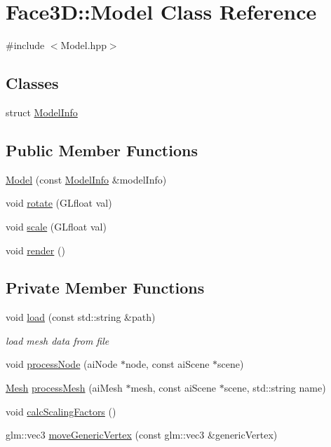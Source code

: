 \hypertarget{class_face3_d_1_1_model}{}\section{Face3D\+:\+:Model Class Reference}
\label{class_face3_d_1_1_model}


{\ttfamily \#include $<$Model.\+hpp$>$}

\subsection*{Classes}
\begin{DoxyCompactItemize}
\item 
struct \hyperlink{struct_face3_d_1_1_model_1_1_model_info}{Model\+Info}
\end{DoxyCompactItemize}
\subsection*{Public Member Functions}
\begin{DoxyCompactItemize}
\item 
\hyperlink{class_face3_d_1_1_model_ae6cd2c6069f0c1f0898ea45356f31250}{Model} (const \hyperlink{struct_face3_d_1_1_model_1_1_model_info}{Model\+Info} \&model\+Info)
\item 
void \hyperlink{class_face3_d_1_1_model_a47fdb34677d2a77da048e614e9100a86}{rotate} (G\+Lfloat val)
\item 
void \hyperlink{class_face3_d_1_1_model_ae4317800ef498c03728e7c82dbe5c3c7}{scale} (G\+Lfloat val)
\item 
void \hyperlink{class_face3_d_1_1_model_a88e8ee28d3babfcb7090f7941663e594}{render} ()
\end{DoxyCompactItemize}
\subsection*{Private Member Functions}
\begin{DoxyCompactItemize}
\item 
void \hyperlink{class_face3_d_1_1_model_a6a5aeb80314d44476b3964c4b977be7d}{load} (const std\+::string \&path)
\begin{DoxyCompactList}\small\item\em load mesh data from file \end{DoxyCompactList}\item 
void \hyperlink{class_face3_d_1_1_model_a483e8a42f180d07ccbeaa10a56b130e0}{process\+Node} (ai\+Node $\ast$node, const ai\+Scene $\ast$scene)
\item 
\hyperlink{class_face3_d_1_1_mesh}{Mesh} \hyperlink{class_face3_d_1_1_model_adfe25f21ec62de6fe960a87031ef5134}{process\+Mesh} (ai\+Mesh $\ast$mesh, const ai\+Scene $\ast$scene, std\+::string name)
\item 
void \hyperlink{class_face3_d_1_1_model_aa5aa4570539e2783c797195bb0e679d1}{calc\+Scaling\+Factors} ()
\item 
glm\+::vec3 \hyperlink{class_face3_d_1_1_model_ab2700b8f556dbdd9ecc6ddbcd25d59d1}{move\+Generic\+Vertex} (const glm\+::vec3 \&generic\+Vertex)
\end{DoxyCompactItemize}
